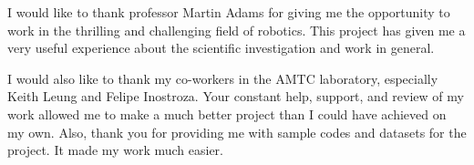 \documentclass[upright, contnum]{umemoria}
\begin{document}
\begin{thanks} %
I would like to thank professor Martin Adams for giving me the opportunity to work in the thrilling and challenging field of robotics. This project has given me a very useful experience about the scientific investigation and work in general.

I would also like to thank my co-workers in the AMTC laboratory, especially Keith Leung and Felipe Inostroza. Your constant help, support, and review of my work allowed me to make a much better project than I could have achieved on my own. Also, thank you for providing me with sample codes and datasets for the project. It made my work much easier.
\end{thanks}
\cleardoublepage

\tableofcontents
\listoftables %
\listoffigures %

\mainmatter










\end{document}
